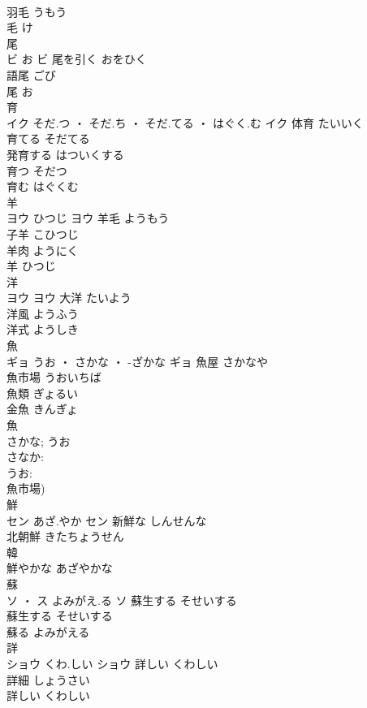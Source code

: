 \documentclass[8pt]{extreport}
\begin{document}
\begin{CJK}{UTF8}{min}
\\	羽毛	うもう	
\\	毛	け	
\\	尾	
\\	ビ	お	ビ	尾を引く	おをひく	
\\	語尾	ごび	
\\	尾	お	
\\	育	
\\	イク	そだ.つ ・ そだ.ち ・ そだ.てる ・ はぐく.む	イク	体育	たいいく	
\\	育てる	そだてる	
\\	発育する	はついくする	
\\	育つ	そだつ	
\\	育む	はぐくむ	
\\	羊	
\\	ヨウ	ひつじ	ヨウ	羊毛	ようもう	
\\	子羊	こひつじ	
\\	羊肉	ようにく	
\\	羊	ひつじ	
\\	洋	
\\	ヨウ		ヨウ	大洋	たいよう	
\\	洋風	ようふう	
\\	洋式	ようしき	
\\	魚	
\\	ギョ	うお ・ さかな ・ -ざかな	ギョ	魚屋	さかなや	
\\	魚市場	うおいちば	
\\	魚類	ぎょるい	
\\	金魚	きんぎょ	
\\	魚 
\\	さかな; うお
\\	さなか: 
\\	うお: 
\\	魚市場)																
\\	鮮	
\\	セン	あざ.やか	セン	新鮮な	しんせんな	
\\	北朝鮮	きたちょうせん	
\\	韓 
\\	鮮やかな	あざやかな	
\\	蘇	
\\	ソ ・ ス	よみがえ.る	ソ	蘇生する	そせいする	
\\	蘇生する	そせいする	
\\	蘇る	よみがえる	
\\	詳	
\\	ショウ	くわ.しい	ショウ	詳しい	くわしい	
\\	詳細	しょうさい	
\\	詳しい	くわしい	

\end{CJK}
\end{document}
